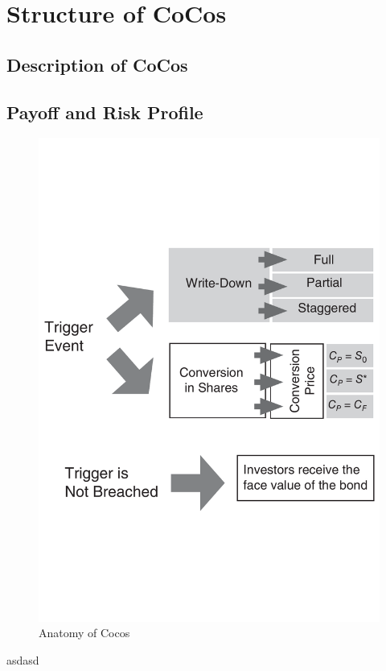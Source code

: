 \chapter{Structure of CoCos}

\section{Description of CoCos}

\section{Payoff and Risk Profile}

\begin{figure}[ht]
	\centering
	\includegraphics[trim=0.6cm 7.05cm 0.9cm 7cm, scale = 0.4]{media/anatomy} \par
	\caption{Anatomy of Cocos \citep{de2011handbook}}
\end{figure}
asdasd


